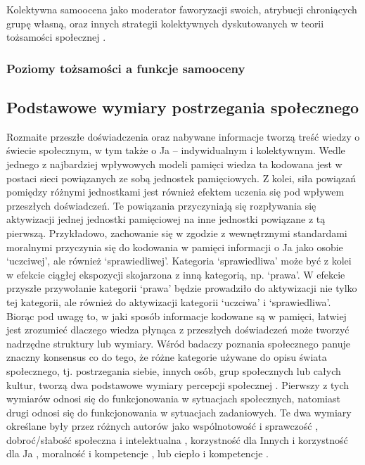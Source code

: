 \documentclass[man]{apa6}
\begin{document}
Kolektywna samoocena jako moderator faworyzacji swoich, atrybucji chroniących grupę własną, oraz innych strategii kolektywnych dyskutowanych w teorii tożsamości społecznej \parencite{crocker1990collective, luhtanen1992collective}.

\subsubsection{Poziomy tożsamości a funkcje samooceny}



\newpage
\subsection{Podstawowe wymiary postrzegania społecznego}

Rozmaite przeszłe doświadczenia oraz nabywane informacje tworzą treść wiedzy o świecie społecznym, w tym także o Ja -- indywidualnym i kolektywnym. Wedle jednego z najbardziej wpływowych modeli pamięci \parencite{anderson1983spreading} wiedza ta kodowana jest w postaci sieci powiązanych ze sobą jednostek pamięciowych. Z kolei, siła powiązań pomiędzy różnymi jednostkami jest również efektem uczenia się pod wpływem przeszłych doświadczeń. Te powiązania przyczyniają się rozpływania się aktywizacji jednej jednostki pamięciowej na inne jednostki powiązane z tą pierwszą. Przykładowo, zachowanie się w zgodzie z wewnętrznymi standardami moralnymi przyczynia się do kodowania w pamięci informacji o Ja jako osobie `uczciwej', ale również `sprawiedliwej'. Kategoria `sprawiedliwa' może być z kolei w efekcie ciągłej ekspozycji skojarzona z inną kategorią, np. `prawa'. W efekcie przyszłe przywołanie kategorii `prawa' będzie prowadziło do aktywizacji nie tylko tej kategorii, ale również do aktywizacji kategorii `uczciwa' i `sprawiedliwa'.\\

Biorąc pod uwagę to, w jaki sposób informacje kodowane są w pamięci, łatwiej jest zrozumieć dlaczego wiedza płynąca z przeszłych doświadczeń może tworzyć nadrzędne struktury lub wymiary. Wśród badaczy poznania społecznego panuje znaczny konsensus co do tego, że różne kategorie używane do opisu świata społecznego, tj. postrzegania siebie, innych osób, grup społecznych lub całych kultur, tworzą dwa podstawowe wymiary percepcji społecznej \parencite{fiske2007universal, judd2005fundamental}. Pierwszy z tych wymiarów odnosi się do funkcjonowania w sytuacjach społecznych, natomiast drugi odnosi się do funkcjonowania w sytuacjach zadaniowych. Te dwa wymiary określane były przez różnych autorów jako wspólnotowość i sprawczość \parencite{abele2007agency}, dobroć/słabość społeczna i intelektualna \parencite {rosenberg1968multidimensional}, korzystność dla Innych i korzystność dla Ja \parencite{peeters1992evaluative}, moralność i kompetencje \parencite{wojciszke2005morality}, lub ciepło i kompetencje \parencite{fiske2002model}.\\
\end{document}
